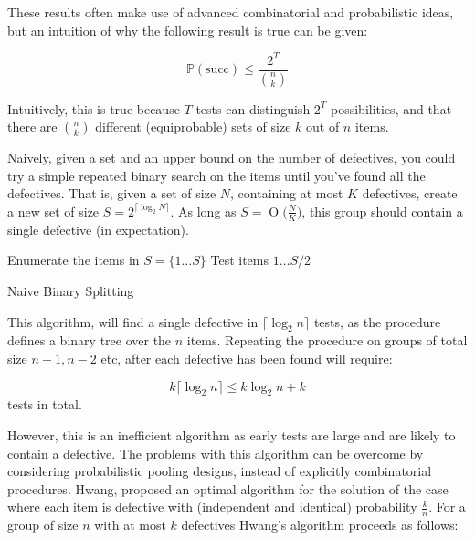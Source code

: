 \documentclass{article}
\newcommand{\BigO}[1]{\ensuremath{\operatorname{O}\bigl(#1\bigr)}}
\begin{document}
These results often make use of advanced combinatorial and probabilistic ideas, but an intuition of why the following result is true can be given:

\begin{equation}
\mathbb{P}\left(\text{succ}\right) \leq \frac{2^T}{\binom{n}{k}}
\end{equation}

Intuitively, this is true because \(T\) tests can distinguish \(2^T\) possibilities, and that there are \(\binom{n}{k}\) different (equiprobable) sets of size \(k\) out of \(n\) items. 

Naively, given a set and an upper bound on the number of defectives, you could try a simple repeated binary search on the items until you've found all the defectives. That is, given a set of size \(N\), containing at most \(K\) defectives, create a new set of size \(S = 2^{\lceil \log_2{N} \rceil}\). As long as \(S = \BigO{\frac{N}{K}}\), this group should contain a single defective (in expectation). 

\bigskip
\begin{algorithm}[H]
 \SetLine %
 Enumerate the items in \(S = \{1\ldots S\}\)\;
	Test items \(1\ldots S/2\)\;
 \caption{Naive Binary Splitting}
\end{algorithm}
\bigskip

This algorithm, will find a single defective in \(\lceil \log_2{n}\rceil\) tests, as the procedure defines a binary tree over the \(n\) items. Repeating the procedure on groups of total size \(n-1, n-2\) etc, after each defective has been found will require:


\begin{equation}
k\lceil\log_2{n}\rceil \leq k\log_2{n} + k
\end{equation}
tests in total. 

However, this is an inefficient algorithm as early tests are large and are likely to contain a defective. The problems with this algorithm can be overcome by considering probabilistic pooling designs, instead of explicitly combinatorial procedures. Hwang, proposed an optimal algorithm for the solution of the case where each item is defective with (independent and identical) probability \(\frac{k}{n}\). For a group of size \(n\) with at most \(k\) defectives Hwang's algorithm proceeds as follows:
\end{document}
